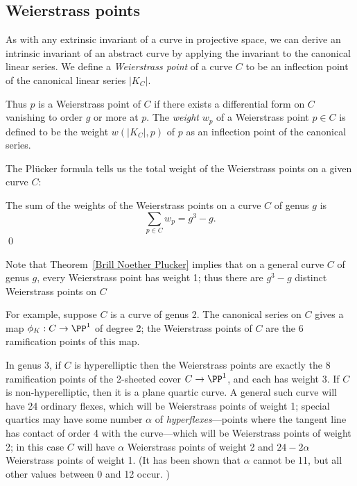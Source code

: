 \subsection{Weierstrass points}

As with any extrinsic invariant of a curve in projective space, we can derive an intrinsic invariant of an abstract curve by applying the invariant to the canonical linear series. We define a \emph{Weierstrass point} of a curve $C$ to be an inflection point of the canonical linear series $|K_C|$. 

Thus $p$ is a Weierstrass point of $C$ if there exists a  differential form on $C$ vanishing to order $g$ or more at $p$. The \emph{weight} $w_p$ of a Weierstrass point $p \in C$  is defined to be the weight $w(|K_C|,p)$ of $p$ as an inflection point of the canonical series. 

The Pl\"ucker formula tells us  the total weight of the Weierstrass points on a given curve $C$:

\begin{corollary}\label{plucker formula}
The sum of the weights of the Weierstrass points on a curve $C$ of genus $g$ is
$$
\sum_{p \in C} w_p = g^3-g.
$$\qed
\end{corollary}

Note that Theorem~\ref{Brill Noether Plucker} implies that on a general curve $C$ of genus $g$, every Weierstrass point has weight 1; thus there are $g^3-g$ distinct Weierstrass points on $C$


For example, suppose $C$ is a curve of genus 2. The canonical series on $C$ gives a map $\phi_K : C \to \PP^1$ of degree 2; the Weierstrass points of $C$ are the 6 ramification points of this map. 

In genus 3, if $C$ is hyperelliptic then the Weierstrass points are exactly the 8 ramification points of the 2-sheeted cover $C \to \PP^1$, and each has weight 3. If $C$ is non-hyperelliptic, then it is a plane quartic curve. A general such curve will have 24 ordinary flexes, which will be Weierstrass points of weight 1; special quartics may have some number $\alpha$ of \emph{hyperflexes}---points where the tangent line has contact of order 4 with the curve---which will be Weierstrass points of weight 2; in this case $C$ will have $\alpha$ Weierstrass points of weight 2 and $24-2\alpha$ Weierstrass points of weight 1. (It has been shown that $\alpha$ cannot be 11, but  all  other values  between 0 and 12 occur. )

